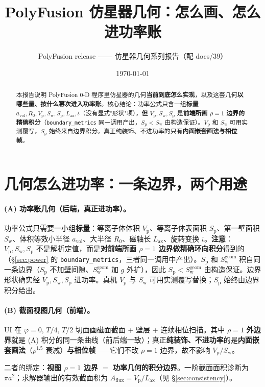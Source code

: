 \documentclass[UTF8,11pt]{ctexart}
\title{PolyFusion 仿星器几何：怎么画、怎么进功率账}
\author{PolyFusion release —— 仿星器几何系列报告（配 docs/39）}
\date{\today}
\newcommand{\Vp}{V_\mathrm{p}}
\newcommand{\Sw}{S_\mathrm{w}}
\newcommand{\Sp}{S_\mathrm{p}}
\newcommand{\Aflux}{A_\mathrm{flux}}
\newcommand{\Lax}{L_\mathrm{ax}}
\newcommand{\iotabar}{\bar{\iota}}
\begin{document}
\maketitle

\begin{abstract}
本报告说明 PolyFusion 0-D 程序里仿星器的几何\textbf{当前到底怎么实现}，以及这套几何\textbf{以哪些量、按什么幂次进入功率账}。核心结论：功率公式只含一组\textbf{标量} $a_\mathrm{vol},R_0,\Vp,\Sw,\Sp,\Lax,\iotabar$（没有显式"形状"项），\textbf{但} $\Vp,\Sw,\Sp$ 是\textbf{前端所画 $\rho{=}1$ 边界的精确积分}（\texttt{boundary\_metrics} 同一调用产出，$\Sp<\Sw$ 由构造保证）。$\Vp$ 和 $\Sw$ 可用实测覆写，$\Sp$ 始终来自边界积分。真正纯装饰、不进功率的只有\textbf{内面嵌套画法与相位帧}。
\end{abstract}

\section{几何怎么进功率：一条边界，两个用途}

\paragraph{(A) 功率账几何（后端，真正进功率）。}
功率公式只需要一小组\textbf{标量}：等离子体体积 $\Vp$、等离子体表面积 $\Sp$、第一壁面积 $\Sw$、体积等效小半径 $a_\mathrm{vol}$、大半径 $R_0$、磁轴长 $\Lax$、旋转变换 $\iotabar$。\textbf{注意}：$\Vp,\Sw,\Sp$ 不是解析定值，而是\textbf{对前端所画 $\rho{=}1$ 边界做精确环向积分}得到的（\S\ref{sec:power} 的 \texttt{boundary\_metrics}，三者同一调用中产出）。$\Sp$ 和 $\Sw^{\mathrm{geom}}$ 积自同一条边界（$\Sp$ 不加壁间隙、$\Sw^{\mathrm{geom}}$ 加 $g$ 外扩），因此 $\Sp<\Sw^{\mathrm{geom}}$ 由构造保证。边界形状确实经 $\Vp,\Sw,\Sp$ 进功率。真机 $V_p$ 与 $\Sw$ 可用实测覆写替换；$\Sp$ 始终由边界积分给出。

\paragraph{(B) 截面视图几何（前端）。}
UI 在 $\varphi=0,\,T/4,\,T/2$ 切面画磁面截面 + 壁层 + 连续相位扫描。其中 $\rho{=}1$ \textbf{外边界}就是 (A) 积分的同一条曲线（前后端一致）；真正\textbf{纯装饰、不进功率}的是\textbf{内面嵌套画法}（$\rho^{1.5}$ 衰减）\textbf{与相位帧}——它们不改 $\rho{=}1$ 边界，故不影响 $\Vp/\Sw$。

二者的绑定：\textbf{视图 $\rho{=}1$ 边界 $=$ 功率几何的积分边界}。一阶截面面积诊断为 $\pi a^2$；求解器输出的有效截面积为 $\Aflux=\Vp/\Lax$（见 \S\ref{sec:consistency}）。
\end{document}
